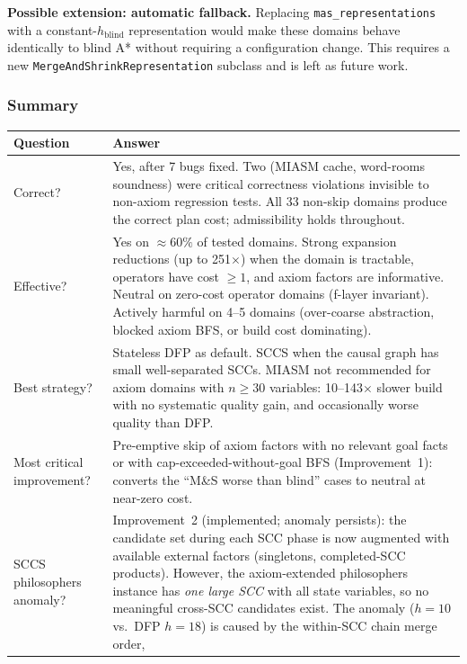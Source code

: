\documentclass[11pt,a4paper]{article}
\begin{document}
\textbf{Possible extension: automatic fallback.}
Replacing \texttt{mas\_representations} with a constant-$h_{\mathrm{blind}}$
representation would make these domains behave identically to blind A* without
requiring a configuration change.  This requires a new
\texttt{MergeAndShrinkRepresentation} subclass and is left as future work.

\subsubsection{Summary}

\begin{center}
\small
\begin{tabular}{lp{9.5cm}}
\toprule
\textbf{Question} & \textbf{Answer} \\
\midrule
Correct? & Yes, after 7 bugs fixed.  Two (MIASM cache, word-rooms soundness)
  were critical correctness violations invisible to non-axiom regression tests.
  All 33 non-skip domains produce the correct plan cost; admissibility holds
  throughout. \\[3pt]
Effective? & Yes on $\approx60\%$ of tested domains.  Strong expansion
  reductions (up to 251$\times$) when the domain is tractable, operators have
  cost $\geq 1$, and axiom factors are informative.  Neutral on zero-cost
  operator domains (f-layer invariant).  Actively harmful on 4--5 domains
  (over-coarse abstraction, blocked axiom BFS, or build cost dominating). \\[3pt]
Best strategy? & Stateless DFP as default.  SCCS when the causal graph has
  small well-separated SCCs.  MIASM not recommended for axiom domains with
  $n \geq 30$ variables: 10--143$\times$ slower build with no systematic
  quality gain, and occasionally worse quality than DFP. \\[3pt]
Most critical improvement? & Pre-emptive skip of axiom factors with no relevant
  goal facts or with cap-exceeded-without-goal BFS (Improvement~1): converts
  the ``M\&S worse than blind'' cases to neutral at near-zero cost. \\[3pt]
SCCS philosophers anomaly? & Improvement~2 (implemented; anomaly persists):
  the candidate set during each SCC phase is now augmented with available
  external factors (singletons, completed-SCC products).  However, the
  axiom-extended philosophers instance has \emph{one large SCC} with all
  state variables, so no meaningful cross-SCC candidates exist.  The anomaly
  ($h=10$ vs.\ DFP $h=18$) is caused by the within-SCC chain merge order,

\end{tabular}
\end{center}
\end{document}
